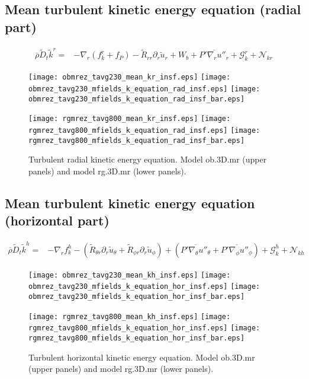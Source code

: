 \documentclass[10pt,paper=a4]{report}
\newcommand{\eht}{\overline}
\newcommand{\fht}{\widetilde}
\newcommand{\fav}{\widetilde}
\newcommand{\av}{\overline}
\begin{document}
\newpage

\subsection{Mean turbulent kinetic energy equation (radial part)}

\begin{align}
\av{\rho} \fav{D}_t \fav{k}^r =  &  -\nabla_r  ( f_k^r + f_P )  - \fht{R}_{rr}\partial_r \fht{u}_r + W_b  + \eht{P'\nabla_r u''_r} + {\mathcal G_k^r} + {\mathcal N_{kr}} \label{eq:rans_ekin_r}
\end{align}

\begin{figure}[!h]
\centerline{
\texttt{[image: obmrez\_tavg230\_mean\_kr\_insf.eps]}
\texttt{[image: obmrez\_tavg230\_mfields\_k\_equation\_rad\_insf.eps]}
\texttt{[image: obmrez\_tavg230\_mfields\_k\_equation\_rad\_insf\_bar.eps]}}

\centerline{
\texttt{[image: rgmrez\_tavg800\_mean\_kr\_insf.eps]}
\texttt{[image: rgmrez\_tavg800\_mfields\_k\_equation\_rad\_insf.eps]}
\texttt{[image: rgmrez\_tavg800\_mfields\_k\_equation\_rad\_insf\_bar.eps]}}
\caption{Turbulent radial kinetic energy equation. Model {\sf ob.3D.mr} (upper panels) and model {\sf rg.3D.mr} (lower panels). \label{fig:kr-equation}}
\end{figure}

\newpage


\subsection{Mean turbulent kinetic energy equation (horizontal part)}

\begin{align}
\av{\rho} \fav{D}_t \fav{k}^h =  &  -\nabla_r f_k^h - (\fht{R}_{\theta r}\partial_r \fht{u}_\theta + \fht{R}_{\phi r}\partial_r \fht{u}_\phi) + (\eht{P' \nabla_\theta u''_\theta} + \eht{P' \nabla_\phi u''_\phi}) + {\mathcal G_k^h} + {\mathcal N_{kh}} \label{eq:rans_ekin_h} 
\end{align}

\begin{figure}[!h]
\centerline{
\texttt{[image: obmrez\_tavg230\_mean\_kh\_insf.eps]}
\texttt{[image: obmrez\_tavg230\_mfields\_k\_equation\_hor\_insf.eps]}
\texttt{[image: obmrez\_tavg230\_mfields\_k\_equation\_hor\_insf\_bar.eps]}}

\centerline{
\texttt{[image: rgmrez\_tavg800\_mean\_kh\_insf.eps]}
\texttt{[image: rgmrez\_tavg800\_mfields\_k\_equation\_hor\_insf.eps]}
\texttt{[image: rgmrez\_tavg800\_mfields\_k\_equation\_hor\_insf\_bar.eps]}}
\caption{Turbulent horizontal kinetic energy equation. Model {\sf ob.3D.mr} (upper panels) and model {\sf rg.3D.mr} (lower panels). \label{fig:kh-equation}}
\end{figure}
\end{document}
